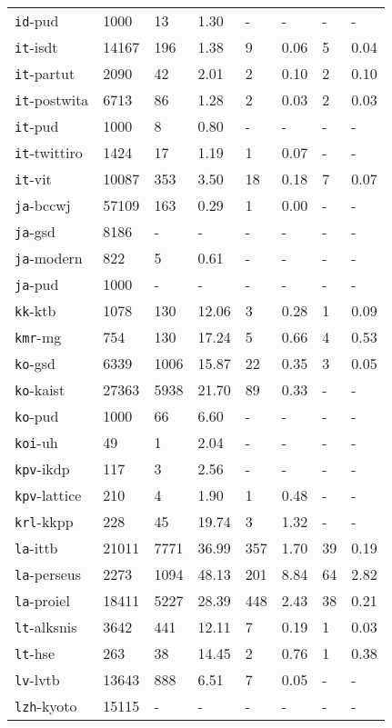 \begin{longtable}{|l|l|l|l|l|l|l|l|}
\texttt{id}-pud & 1000 & 13 & 1.30 & - & - & - & -\\
\texttt{it}-isdt & 14167 & 196 & 1.38 & 9 & 0.06 & 5 & 0.04\\
\texttt{it}-partut & 2090 & 42 & 2.01 & 2 & 0.10 & 2 & 0.10\\
\texttt{it}-postwita & 6713 & 86 & 1.28 & 2 & 0.03 & 2 & 0.03\\
\texttt{it}-pud & 1000 & 8 & 0.80 & - & - & - & -\\
\texttt{it}-twittiro & 1424 & 17 & 1.19 & 1 & 0.07 & - & -\\
\texttt{it}-vit & 10087 & 353 & 3.50 & 18 & 0.18 & 7 & 0.07\\
\texttt{ja}-bccwj & 57109 & 163 & 0.29 & 1 & 0.00 & - & -\\
\texttt{ja}-gsd & 8186 & - & - & - & - & - & -\\
\texttt{ja}-modern & 822 & 5 & 0.61 & - & - & - & -\\
\texttt{ja}-pud & 1000 & - & - & - & - & - & -\\
\texttt{kk}-ktb & 1078 & 130 & 12.06 & 3 & 0.28 & 1 & 0.09\\
\texttt{kmr}-mg & 754 & 130 & 17.24 & 5 & 0.66 & 4 & 0.53\\
\texttt{ko}-gsd & 6339 & 1006 & 15.87 & 22 & 0.35 & 3 & 0.05\\
\texttt{ko}-kaist & 27363 & 5938 & 21.70 & 89 & 0.33 & - & -\\
\texttt{ko}-pud & 1000 & 66 & 6.60 & - & - & - & -\\
\texttt{koi}-uh & 49 & 1 & 2.04 & - & - & - & -\\
\texttt{kpv}-ikdp & 117 & 3 & 2.56 & - & - & - & -\\
\texttt{kpv}-lattice & 210 & 4 & 1.90 & 1 & 0.48 & - & -\\
\texttt{krl}-kkpp & 228 & 45 & 19.74 & 3 & 1.32 & - & -\\
\texttt{la}-ittb & 21011 & 7771 & 36.99 & 357 & 1.70 & 39 & 0.19\\
\texttt{la}-perseus & 2273 & 1094 & 48.13 & 201 & 8.84 & 64 & 2.82\\
\texttt{la}-proiel & 18411 & 5227 & 28.39 & 448 & 2.43 & 38 & 0.21\\
\texttt{lt}-alksnis & 3642 & 441 & 12.11 & 7 & 0.19 & 1 & 0.03\\
\texttt{lt}-hse & 263 & 38 & 14.45 & 2 & 0.76 & 1 & 0.38\\
\texttt{lv}-lvtb & 13643 & 888 & 6.51 & 7 & 0.05 & - & -\\
\texttt{lzh}-kyoto & 15115 & - & - & - & - & - & -\\

\end{longtable}
